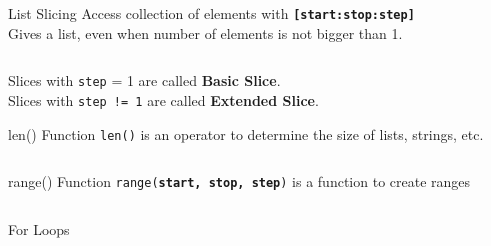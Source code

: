         \begin{frame}{List Slicing}
            \Large
            Access collection of elements with \textbf{\texttt{[start:stop:step]}}\\
            Gives a list, even when number of elements is not bigger than 1.
            \inputminted[frame=single,framesep=2pt,firstline=10]{python3}{../Review1/code-examples/slicing.py}                                
            \LARGE
            Slices with \texttt{step} = 1 are called \textbf{Basic Slice}.\\
            Slices with \texttt{step != 1} are called \textbf{Extended Slice}.
        \end{frame}

        \begin{frame}{len() Function}
          \pause
          \LARGE
          \texttt{len()} is an operator to determine the size of lists, strings, etc.
          \pause
          \bigskip
          \inputminted[frame=single,framesep=2pt]{python3}{../Lecture3/code-examples/length.py}
        \end{frame}

        \begin{frame}{range() Function}
            \pause
            \LARGE
            \texttt{range(\textbf{start, stop, step})} is a function to create ranges
            \bigskip
            \inputminted[frame=single,framesep=2pt]{python3}{../Lecture3/code-examples/range.py}
        \end{frame}
      
        \begin{frame}{For Loops}
            \pause
            \begin{columns}
                \begin{column}{0.5\textwidth}
                    \inputminted[frame=single,framesep=2pt]{python3}{../Lecture3/code-examples/for1.py}
                \end{column}
               \pause 
                \begin{column}{0.5\textwidth}
                    \inputminted[frame=single,framesep=2pt]{python3}{../Lecture3/code-examples/for2.py}
                    \pause
                    \inputminted[frame=single,framesep=2pt]{python3}{../Lecture3/code-examples/for3.py}
                    \pause
                    \inputminted[frame=single,framesep=2pt]{python3}{../Lecture3/code-examples/for4.py}
                \end{column} 
            \end{columns}
        \end{frame}
        
